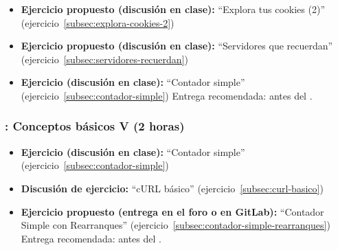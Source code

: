 \documentclass[a4paper,12pt]{article}
\begin{document}
\begin{itemize}
\item \textbf{Ejercicio propuesto (discusión en clase):} ``Explora tus cookies (2)'' (ejercicio~\ref{subsec:explora-cookies-2}) 
\item \textbf{Ejercicio propuesto (discusión en clase):} ``Servidores que recuerdan'' (ejercicio~\ref{subsec:servidores-recuerdan}) 
\item \textbf{Ejercicio (discusión en clase):} ``Contador simple'' (ejercicio~\ref{subsec:contador-simple})
  Entrega recomendada: antes del \juevesE.
\end{itemize}

\subsubsection{\juevesE: Conceptos básicos V (2 horas)}
\label{cal:juevesE}

\begin{itemize}
\item \textbf{Ejercicio (discusión en clase):} ``Contador simple'' (ejercicio~\ref{subsec:contador-simple})
\item \textbf{Discusión de ejercicio:} ``cURL básico'' (ejercicio~\ref{subsec:curl-basico})
\item \textbf{Ejercicio propuesto (entrega en el foro o en GitLab):} ``Contador Simple con Rearranques'' (ejercicio~\ref{subsec:contador-simple-rearranques})
 \\
  Entrega recomendada: antes del \juevesF.
\end{itemize}


\end{document}
